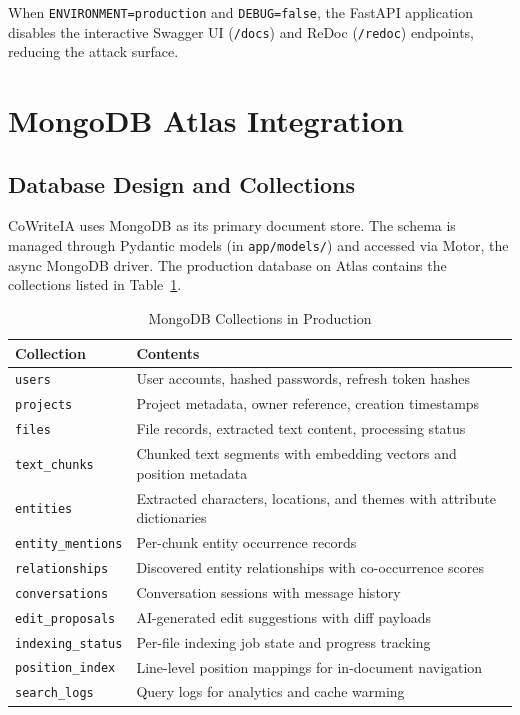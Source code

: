 When \texttt{ENVIRONMENT=production} and \texttt{DEBUG=false}, the FastAPI application disables the interactive Swagger UI (\texttt{/docs}) and ReDoc (\texttt{/redoc}) endpoints, reducing the attack surface.

\section{MongoDB Atlas Integration}
\label{sec:mongodb-atlas}

\subsection{Database Design and Collections}

CoWriteIA uses MongoDB as its primary document store. The schema is managed through Pydantic models (in \texttt{app/models/}) and accessed via Motor, the async MongoDB driver. The production database on Atlas contains the collections listed in Table~\ref{tab:mongo-collections}.

\begin{table}[H]
\centering
\begin{tabular}{|p{4cm}|p{9.5cm}|}
\hline
\textbf{Collection} & \textbf{Contents} \\
\hline
\texttt{users} & User accounts, hashed passwords, refresh token hashes \\
\hline
\texttt{projects} & Project metadata, owner reference, creation timestamps \\
\hline
\texttt{files} & File records, extracted text content, processing status \\
\hline
\texttt{text\_chunks} & Chunked text segments with embedding vectors and position metadata \\
\hline
\texttt{entities} & Extracted characters, locations, and themes with attribute dictionaries \\
\hline
\texttt{entity\_mentions} & Per-chunk entity occurrence records \\
\hline
\texttt{relationships} & Discovered entity relationships with co-occurrence scores \\
\hline
\texttt{conversations} & Conversation sessions with message history \\
\hline
\texttt{edit\_proposals} & AI-generated edit suggestions with diff payloads \\
\hline
\texttt{indexing\_status} & Per-file indexing job state and progress tracking \\
\hline
\texttt{position\_index} & Line-level position mappings for in-document navigation \\
\hline
\texttt{search\_logs} & Query logs for analytics and cache warming \\
\hline
\end{tabular}
\caption{MongoDB Collections in Production}
\label{tab:mongo-collections}
\end{table}

